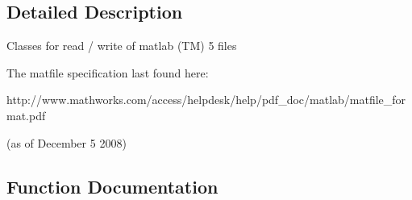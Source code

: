 \subsection{Detailed Description}
\begin{DoxyVerb}Classes for read / write of matlab (TM) 5 files

The matfile specification last found here:

http://www.mathworks.com/access/helpdesk/help/pdf_doc/matlab/matfile_format.pdf

(as of December 5 2008)
\end{DoxyVerb}
 

\subsection{Function Documentation}
\hypertarget{namespacescipy_1_1io_1_1matlab_1_1mio5_a8c4dd2e2f6519a465bfef7e268142a52}{}
